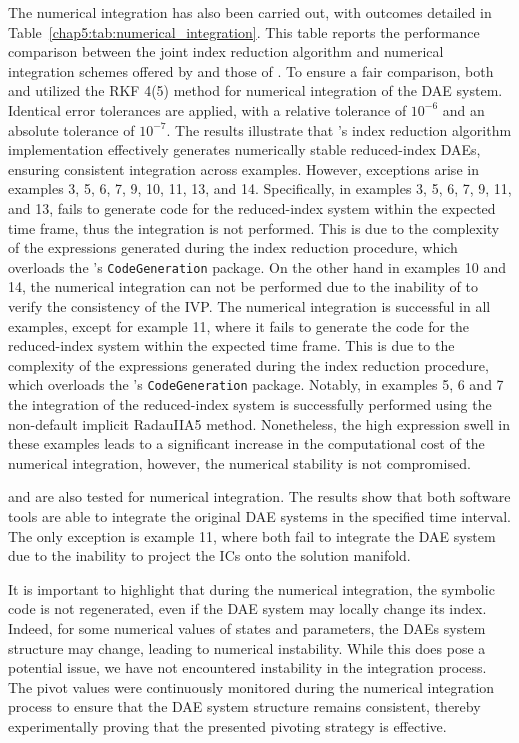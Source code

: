 The numerical integration has also been carried out, with outcomes detailed in Table~\ref{chap5:tab:numerical_integration}. This table reports the performance comparison between the joint index reduction algorithm and numerical integration schemes offered by \Maple{} and those of \Indigo{}. To ensure a fair comparison, both \Maple{} and \Indigo{} utilized the \ac{RKF} 4(5) method for numerical integration of the \ac{DAE} system. Identical error tolerances are applied, with a relative tolerance of $10^{-6}$ and an absolute tolerance of $10^{-7}$. The results illustrate that \Indigo{}'s index reduction algorithm implementation effectively generates numerically stable reduced-index \acp{DAE}, ensuring consistent integration across examples. However, exceptions arise in examples 3, 5, 6, 7, 9, 10, 11, 13, and 14. Specifically, in examples 3, 5, 6, 7, 9, 11, and 13, \Maple{} fails to generate code for the reduced-index system within the expected time frame, thus the integration is not performed. This is due to the complexity of the expressions generated during the index reduction procedure, which overloads the \Maple{}'s \texttt{CodeGeneration} package. On the other hand in examples 10 and 14, the numerical integration can not be performed due to the inability of \Maple{} to verify the consistency of the \ac{IVP}. The \Indigo{} numerical integration is successful in all examples, except for example 11, where it fails to generate the code for the reduced-index system within the expected time frame. This is due to the complexity of the expressions generated during the index reduction procedure, which overloads the \Indigo{}'s \texttt{CodeGeneration} package. Notably, in examples 5, 6 and 7 the integration of the reduced-index system is successfully performed using the non-default implicit RadauIIA5 method. Nonetheless, the high expression swell in these examples leads to a significant increase in the computational cost of the numerical integration, however, the numerical stability is not compromised.

\Mathematica{} and \Matlab{} are also tested for numerical integration. The results show that both software tools are able to integrate the original \ac{DAE} systems in the specified time interval. The only exception is example 11, where both fail to integrate the \ac{DAE} system due to the inability to project the \acp{IC} onto the solution manifold.

It is important to highlight that during the numerical integration, the symbolic code is not regenerated, even if the \ac{DAE} system may locally change its index. Indeed, for some numerical values of states and parameters, the \acp{DAE} system structure may change, leading to numerical instability. While this does pose a potential issue, we have not encountered instability in the integration process. The pivot values were continuously monitored during the numerical integration process to ensure that the \ac{DAE} system structure remains consistent, thereby experimentally proving that the presented pivoting strategy is effective.



